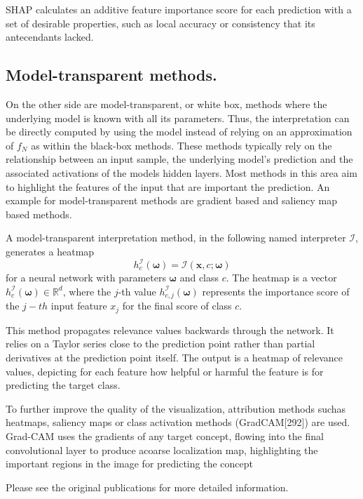 SHAP \cite{lundberg2017unified} calculates an additive feature importance score for each prediction with a set of desirable properties, such as local accuracy or consistency that its antecendants lacked. 

\subsection{Model-transparent methods.}
\label{subsec:wb_methods}

On the other side are model-transparent, or white box, methods where the underlying model is known with all its parameters. Thus, the interpretation can be directly computed by using the model instead of relying on an approximation of $f_N$ as within the black-box methods. These methods typically rely on the relationship between an input sample, the underlying model's prediction and the associated activations of the models hidden layers. Most methods in this area aim to highlight the features of the input that are important the prediction.  
An example for model-transparent methods are gradient based and saliency map based methods. 

A model-transparent interpretation method, in the following named interpreter $\mathcal{I}$, generates a heatmap
 $$h_c^\mathcal{I}(\boldsymbol{\omega}) = \mathcal{I}(\mathbf{x}, c; \boldsymbol{\omega})$$
  for a neural network with parameters $\boldsymbol{\omega}$ and class $c$. The heatmap is a vector $h_c^\mathcal{I}(\boldsymbol{\omega}) \in \mathbb{R}^d$, where the $j$-th value $h_{c, j}^\mathcal{I}(\boldsymbol{\omega})$ represents the importance score of the $j-th$ input feature $x_j$ for the final score of class $c$.

This method \cite{bach2015pixel} propagates relevance values backwards through the network. It relies on a Taylor series close to the prediction point rather than partial derivatives at the prediction point itself. The output is a heatmap of relevance values, depicting for each feature how helpful or harmful the feature is for predicting the target class. 

 \cite{selvaraju2017grad}
To further improve the quality of the visualization, attribution methods suchas heatmaps, saliency maps or class activation methods (GradCAM[292]) are used. Grad-CAM uses the gradients of any target concept, flowing into the final convolutional layer to produce acoarse localization map, highlighting the important regions in the image for predicting the concept



Please see the original publications for more detailed information. 